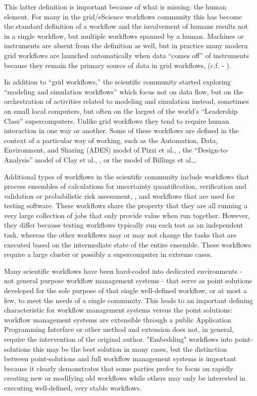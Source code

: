 This latter definition is important because of what is missing: the human
element. For many in the grid/eScience workflows community this has become the
standard definition of a workflow and the involvement of humans results not in a
single workflow, but multiple workflows spanned by a human.  Machines or
instruments are absent from the definition as well, but in practice many modern
grid workflows are launched automatically when data ``comes off'' of instruments
because they remain the primary source of data in grid workflows, (c.f. -
\cite{megino_panda:_2015}).

In addition to ``grid workflows,'' the scientific community started exploring
``modeling and simulation workflows'' which focus not on data flow, but on the
orchestration of activities related to modeling and simulation instead,
sometimes on small local computers, but often on the largest of the world's
``Leadership Class'' supercomputers. Unlike grid workflows they tend to require
human interaction in one way or another.  Some of these workflows are defined in
the context of a particular way of working, such as the Automation, Data,
Environment, and Sharing (ADES) model of Pizzi et al., \cite{pizzi_aiida:_2016},
the ``Design-to-Analysis'' model of Clay et al., \cite{clay_incorporating_2015},
or the model of Billings et al.,\cite{billings_eclipse_2017}.

Additional types of workflows in the scientific community include workflows that
process ensembles of calculations for uncertainty quantification, verification
and validation or probabilistic risk assessment, \cite{montoya_apex_2016}, and
workflows that are used for testing software. These workflows share the property
that they are all running a very large collection of jobs that only provide
value when run together. However, they differ because testing workflows
typically run each test as an independent task, whereas the other workflows may
or may not change the tasks that are executed based on the intermediate state of
the entire ensemble. These workflows require a large cluster or possibly a
supercomputer in extreme cases.

Many scientific workflows have been hard-coded into dedicated environments - not
general purpose workflow management systems - that serve as point solutions
developed for the sole purpose of that single well-defined workflow, or at most
a few, to meet the needs of a single community. This leads to an important
defining characteristic for workflow management systems versus the point
solutions: workflow management systems are extensible through a public
Application Programming Interface or other method and extension does not, in
general, require the intervention of the original author. "Embedding" workflows
into point-solutions this may be the best solution in many cases, but the
distinction between point-solutions and full workflow management systems is
important because it clearly demonstrates  that some parties prefer to focus on
rapidly creating new or modifying old workflows while others may only be
interested in executing well-defined, very stable workflows.

